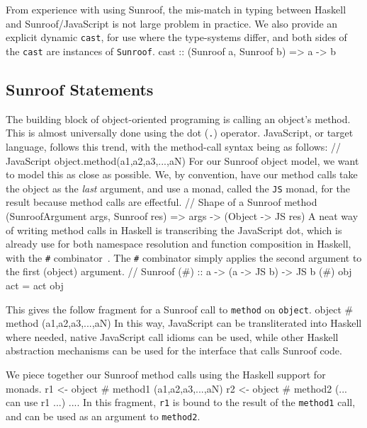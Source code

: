 \documentclass{llncs}
\newcommand{\Src}[1]{{\tt{#1}}}
\newenvironment{Code}{\verbatim}{\endverbatim}
\begin{document}
From experience with using Sunroof,
the mis-match in typing between Haskell and Sunroof/JavaScript
is not large problem in practice.
We also provide an explicit dynamic \Src{cast},
for use where the type-systems differ,
and both sides of the \Src{cast} are instances of \Src{Sunroof}.
\begin{Code}
cast :: (Sunroof a, Sunroof b) => a -> b
\end{Code}

\subsection{Sunroof Statements}

The building block of object-oriented programing is calling an object's method.
This is almost universally done using the dot (\Src{.}) operator. JavaScript, or target language, 
follows this trend, with the method-call syntax being as follows:
\begin{Code}
  // JavaScript
  object.method(a1,a2,a3,...,aN)
\end{Code}
For our Sunroof object model, we want to model this as close as possible.
We, by convention, have our method calls take the object as the {\em last\/} argument,
and use a monad, called the \Src{JS} monad, for the result because method calls are effectful.
\begin{Code}
// Shape of a Sunroof method
(SunroofArgument args, Sunroof res) => args -> (Object -> JS res)
\end{Code}
A neat way of writing method calls in Haskell is transcribing the JavaScript dot, which is already use
for both namespace resolution and function composition in Haskell, with the \Src{\#} combinator~\cite{Shields:01:Babel}.
The \Src{\#} combinator simply applies the second argument to the first (object) argument.
\begin{Code}
// Sunroof        
(#) :: a -> (a -> JS b) -> JS b
(#) obj act = act obj
\end{Code}

\noindent
This gives the follow fragment for a Sunroof call to \Src{method} on \Src{object}.
\begin{Code}
  object # method (a1,a2,a3,...,aN)
\end{Code}
In this way, JavaScript can be transliterated into Haskell where needed,
native JavaScript call idioms can be used,
while other Haskell abstraction mechanisms can be used for the interface that calls Sunroof code.

We piece together our Sunroof method calls using the Haskell support for monads.
\begin{Code}
  r1 <- object # method1 (a1,a2,a3,...,aN)
  r2 <- object # method2 (... can use r1 ...)
  ....
\end{Code} 
In this fragment, \Src{r1} is bound to the result of the \Src{method1} call,
and can be used as an argument to \Src{method2}.
\end{document}
